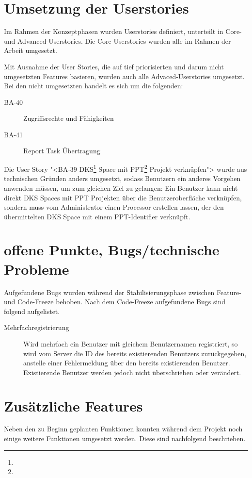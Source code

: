 			
	\section{Umsetzung der Userstories}
		Im Rahmen der Konzeptphasen wurden Userstories definiert, unterteilt in Core- und Advanced-Userstories.
		Die Core-Userstories wurden alle im Rahmen der Arbeit umgesetzt.
		
		Mit Ausnahme der User Stories, die auf tief priorisierten und darum nicht umgesetzten Features basieren, wurden auch alle Advaced-Userstories umgesetzt.
		Bei den nicht umgesetzten handelt es sich um die folgenden:
		
		\begin{description}
			\item[BA-40] Zugriffsrechte und Fähigkeiten
			\item[BA-41] Report Task Übertragung
		\end{description}
		
		Die User Story "<BA-39 DKS\footnote{\dks} Space mit PPT\footnote{\ppt} Projekt verknüpfen"> wurde aus technischen Gründen anders umgesetzt, 
		sodass Benutzern ein anderes Vorgehen anwenden müssen, um zum gleichen Ziel zu gelangen: Ein Benutzer kann nicht direkt DKS Spaces mit PPT Projekten über die Benutzeroberfläche verknüpfen, sondern muss vom Administrator einen Processor erstellen lassen, der den übermittelten DKS Space mit einem PPT-Identifier verknüpft.

	
	\section{offene Punkte, Bugs/technische Probleme}
		Aufgefundene Bugs wurden während der Stabilisierungsphase zwischen Feature- und Code-Freeze behoben. Nach dem Code-Freeze aufgefundene Bugs sind folgend aufgelistet.
	
		\begin{description}
			\item[Mehrfachregistrierung] Wird mehrfach ein Benutzer mit gleichem Benutzernamen registriert, so wird vom Server die ID des bereits existierenden Benutzers zurückgegeben, anstelle einer Fehlermeldung über den bereits existierenden Benutzer.
			Existierende Benutzer werden jedoch nicht überschrieben oder verändert.
		\end{description}
	
	
	\section{Zusätzliche Features}
		Neben den zu Beginn geplanten Funktionen konnten während dem Projekt noch einige weitere Funktionen umgesetzt werden.
		Diese sind nachfolgend beschrieben.
